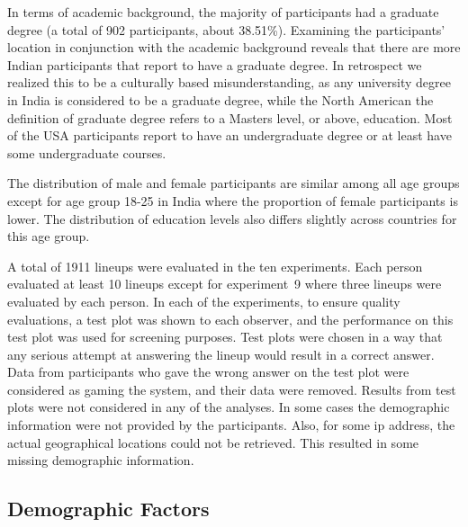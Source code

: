 \documentclass[10pt]{article}\usepackage[]{graphicx}\usepackage[]{color}
\begin{document}
In terms of academic background, the majority of participants had a graduate degree (a total of 902 participants, about 38.51\%). Examining the participants' location in conjunction with the academic background reveals that there are more Indian participants that report to have a graduate degree. In retrospect we realized this to be a culturally based misunderstanding, as any university degree in India is considered to be a graduate degree, while the North American the definition of graduate degree refers to a Masters level, or above, education. Most of the USA participants report to have an undergraduate degree or at least have some undergraduate courses. 

The distribution of male and female participants are similar among all age groups except for age group 18-25 in India where the proportion of female participants is lower. The distribution of education levels also differs slightly across countries for this age group. %

A total of 1911 lineups were evaluated in the ten experiments. Each person evaluated at least 10 lineups except for experiment~9 where three lineups were evaluated by each person. 
In each of the experiments, to ensure quality evaluations, a test plot was shown to each observer, and the performance on this test plot was used for screening purposes.%
Test plots were chosen in a way that any serious attempt at answering the lineup would result in a correct answer.
Data from participants who gave the wrong answer on the test plot were considered as gaming the system, and their data were removed.
Results from test plots were not considered in any of the analyses.
 In some cases the demographic information were not provided by the participants. Also, for some ip address, the actual geographical locations could not be retrieved. This resulted in some missing demographic information.

\subsection{Demographic Factors} 
\end{document}
